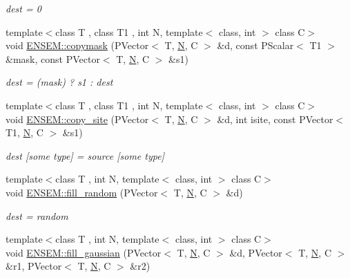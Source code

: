 \begin{DoxyCompactItemize}
\begin{DoxyCompactList}\small\item\em dest = 0 \end{DoxyCompactList}\item 
{\footnotesize template$<$class T , class T1 , int N, template$<$ class, int $>$ class C$>$ }\\void \mbox{\hyperlink{group__primvector_ga6018d56f682cba0fc157b7df0ac3b403}{E\+N\+S\+E\+M\+::copymask}} (P\+Vector$<$ T, \mbox{\hyperlink{adat__devel_2lib_2hadron_2operator__name__util_8cc_a7722c8ecbb62d99aee7ce68b1752f337}{N}}, C $>$ \&d, const P\+Scalar$<$ T1 $>$ \&mask, const P\+Vector$<$ T, \mbox{\hyperlink{adat__devel_2lib_2hadron_2operator__name__util_8cc_a7722c8ecbb62d99aee7ce68b1752f337}{N}}, C $>$ \&s1)
\begin{DoxyCompactList}\small\item\em dest = (mask) ? s1 \+: dest \end{DoxyCompactList}\item 
{\footnotesize template$<$class T , class T1 , int N, template$<$ class, int $>$ class C$>$ }\\void \mbox{\hyperlink{group__primvector_ga7ec4d85cf781e6147a5e1b9ac46234e4}{E\+N\+S\+E\+M\+::copy\+\_\+site}} (P\+Vector$<$ T, \mbox{\hyperlink{adat__devel_2lib_2hadron_2operator__name__util_8cc_a7722c8ecbb62d99aee7ce68b1752f337}{N}}, C $>$ \&d, int isite, const P\+Vector$<$ T1, \mbox{\hyperlink{adat__devel_2lib_2hadron_2operator__name__util_8cc_a7722c8ecbb62d99aee7ce68b1752f337}{N}}, C $>$ \&s1)
\begin{DoxyCompactList}\small\item\em dest \mbox{[}some type\mbox{]} = source \mbox{[}some type\mbox{]} \end{DoxyCompactList}\item 
{\footnotesize template$<$class T , int N, template$<$ class, int $>$ class C$>$ }\\void \mbox{\hyperlink{group__primvector_ga3170048baaf649f10798f2d8e0b41c86}{E\+N\+S\+E\+M\+::fill\+\_\+random}} (P\+Vector$<$ T, \mbox{\hyperlink{adat__devel_2lib_2hadron_2operator__name__util_8cc_a7722c8ecbb62d99aee7ce68b1752f337}{N}}, C $>$ \&d)
\begin{DoxyCompactList}\small\item\em dest = random \end{DoxyCompactList}\item 
{\footnotesize template$<$class T , int N, template$<$ class, int $>$ class C$>$ }\\void \mbox{\hyperlink{group__primvector_ga54096af2b60c9427d37bd363286b820f}{E\+N\+S\+E\+M\+::fill\+\_\+gaussian}} (P\+Vector$<$ T, \mbox{\hyperlink{adat__devel_2lib_2hadron_2operator__name__util_8cc_a7722c8ecbb62d99aee7ce68b1752f337}{N}}, C $>$ \&d, P\+Vector$<$ T, \mbox{\hyperlink{adat__devel_2lib_2hadron_2operator__name__util_8cc_a7722c8ecbb62d99aee7ce68b1752f337}{N}}, C $>$ \&r1, P\+Vector$<$ T, \mbox{\hyperlink{adat__devel_2lib_2hadron_2operator__name__util_8cc_a7722c8ecbb62d99aee7ce68b1752f337}{N}}, C $>$ \&r2)

\end{DoxyCompactItemize}
